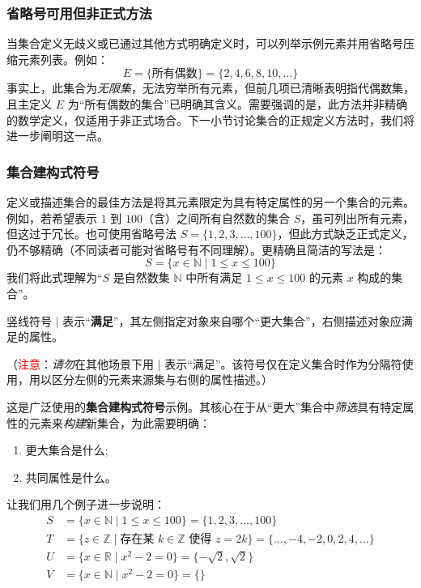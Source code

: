 \subsubsection*{省略号可用但非正式方法}

当集合定义无歧义或已通过其他方式明确定义时，可以列举示例元素并用省略号压缩元素列表。例如：
\[E = \{\text{所有偶数}\} = \{2, 4, 6, 8, 10, \dots\}\]
事实上，此集合为\emph{无限集}，无法穷举所有元素，但前几项已清晰表明指代偶数集，且主定义 $E$ 为``所有偶数的集合''已明确其含义。需要强调的是，此方法并非精确的数学定义，仅适用于非正式场合。下一小节讨论集合的正规定义方法时，我们将进一步阐明这一点。

\subsubsection*{集合建构式符号}

定义或描述集合的最佳方法是将其元素限定为具有特定属性的另一个集合的元素。例如，若希望表示 $1$ 到 $100$（含）之间所有自然数的集合 $S$，虽可列出所有元素，但这过于冗长。也可使用省略号法 $S = \{1, 2, 3, \dots , 100\}$，但此方式缺乏正式定义，仍不够精确（不同读者可能对省略号有不同理解）。更精确且简洁的写法是：
\[S = \{x \in \mathbb{N} \mid 1 \le x \le 100\}\]
我们将此式理解为``$S$ 是自然数集 $\mathbb{N}$ 中所有满足 $1 \le x \le 100$ 的元素 $x$ 构成的集合''。

竖线符号 $\mid$ 表示``\textbf{满足}''，其左侧指定对象来自哪个``更大集合''，右侧描述对象应满足的属性。

（\textcolor{red}{注意}：\emph{请勿}在其他场景下用 $\mid$ 表示``满足''。该符号仅在定义集合时作为分隔符使用，用以区分左侧的元素来源集与右侧的属性描述。）

这是广泛使用的\textbf{集合建构式符号}示例。其核心在于从``更大''集合中\emph{筛选}具有特定属性的元素来\emph{构建}新集合，为此需要明确：
\begin{enumerate}[label=(\arabic*)]
    \item 更大集合是什么;
    \item 共同属性是什么。
\end{enumerate}

让我们用几个例子进一步说明：
\begin{align*}
    S &= \{x \in \mathbb{N} \mid 1 \le x \le 100\} = \{1, 2, 3, \dots , 100\} \\
    T &= \{z \in \mathbb{Z} \mid \text{存在某\ } k \in \mathbb{Z} \text{\ 使得\ } z = 2k\} = \{\dots , -4, -2, 0, 2, 4, \dots\} \\
    U &= \{x \in \mathbb{R} \mid x^2 - 2 = 0\} = \{-\sqrt{2}, \sqrt{2}\}\\
    V &= \{x \in \mathbb{N} \mid x^2 - 2 = 0\}= \{ \}
\end{align*}

